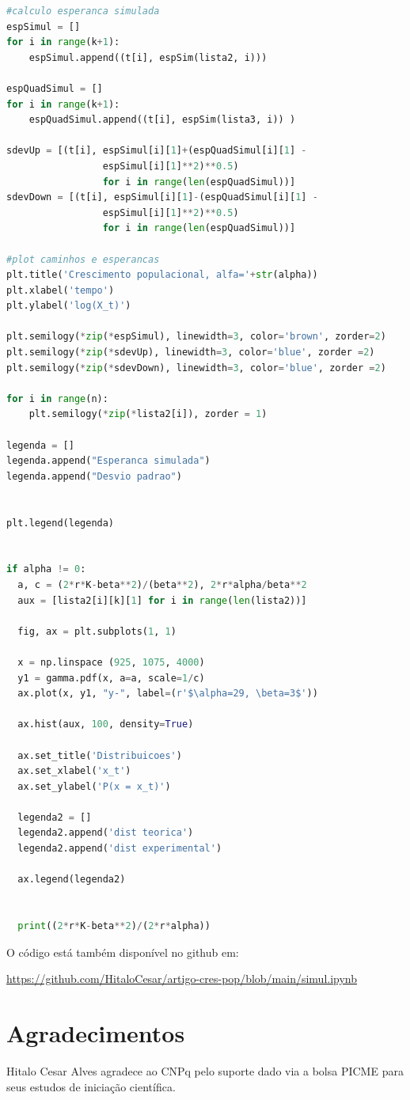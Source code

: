 \documentclass[12pt]{article}
\begin{document}
\begin{lstlisting}[language=Python]
#calculo esperanca simulada
espSimul = []
for i in range(k+1):
    espSimul.append((t[i], espSim(lista2, i)))

espQuadSimul = []
for i in range(k+1):
    espQuadSimul.append((t[i], espSim(lista3, i)) )

sdevUp = [(t[i], espSimul[i][1]+(espQuadSimul[i][1] -
				 espSimul[i][1]**2)**0.5)
				 for i in range(len(espQuadSimul))]
sdevDown = [(t[i], espSimul[i][1]-(espQuadSimul[i][1] -
				 espSimul[i][1]**2)**0.5)
				 for i in range(len(espQuadSimul))]

#plot caminhos e esperancas
plt.title('Crescimento populacional, alfa='+str(alpha))
plt.xlabel('tempo')
plt.ylabel('log(X_t)')

plt.semilogy(*zip(*espSimul), linewidth=3, color='brown', zorder=2)
plt.semilogy(*zip(*sdevUp), linewidth=3, color='blue', zorder =2)
plt.semilogy(*zip(*sdevDown), linewidth=3, color='blue', zorder =2)

for i in range(n):
    plt.semilogy(*zip(*lista2[i]), zorder = 1)

legenda = []
legenda.append("Esperanca simulada")
legenda.append("Desvio padrao")


plt.legend(legenda)


if alpha != 0:
  a, c = (2*r*K-beta**2)/(beta**2), 2*r*alpha/beta**2
  aux = [lista2[i][k][1] for i in range(len(lista2))]

  fig, ax = plt.subplots(1, 1)

  x = np.linspace (925, 1075, 4000) 
  y1 = gamma.pdf(x, a=a, scale=1/c)
  ax.plot(x, y1, "y-", label=(r'$\alpha=29, \beta=3$')) 

  ax.hist(aux, 100, density=True)

  ax.set_title('Distribuicoes')
  ax.set_xlabel('x_t')
  ax.set_ylabel('P(x = x_t)')

  legenda2 = []
  legenda2.append('dist teorica')
  legenda2.append('dist experimental')

  ax.legend(legenda2)


  print((2*r*K-beta**2)/(2*r*alpha))


\end{lstlisting}
O código está também disponível no github em:

\href{URL}{https://github.com/HitaloCesar/artigo-cres-pop/blob/main/simul.ipynb}

\section{Agradecimentos}
Hitalo Cesar Alves agradece ao CNPq pelo suporte dado via a bolsa PICME para seus estudos de iniciação científica.
\end{document}
